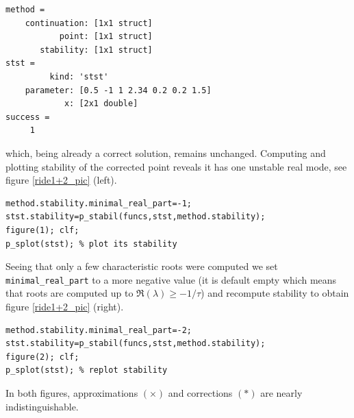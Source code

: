 \documentclass[10pt]{scrartcl}
\newcommand{\blist}[1]{\mbox{\lstinline!#1!}}
\begin{document}
{\small
\begin{verbatim}
method = 
    continuation: [1x1 struct]
           point: [1x1 struct]
       stability: [1x1 struct]
stst = 
         kind: 'stst'
    parameter: [0.5 -1 1 2.34 0.2 0.2 1.5]
            x: [2x1 double]
success =
     1
\end{verbatim}
}
\noindent which, being already a correct solution, remains unchanged.
Computing and plotting stability of the corrected point reveals 
it has one unstable real mode, see figure \ref{ride1+2_pic} (left).
\begin{lstlisting}
method.stability.minimal_real_part=-1;
stst.stability=p_stabil(funcs,stst,method.stability);
figure(1); clf;
p_splot(stst); % plot its stability  
\end{lstlisting}
Seeing that only a few characteristic roots were computed we set
\blist{minimal_real_part} to a more negative value (it is default
empty which means that roots are computed up to
$\Re(\lambda)\geq-1/\tau$) and recompute stability to obtain figure
\ref{ride1+2_pic} (right).  
\begin{lstlisting}
method.stability.minimal_real_part=-2;
stst.stability=p_stabil(funcs,stst,method.stability);
figure(2); clf;
p_splot(stst); % replot stability  
\end{lstlisting}
\noindent In both figures, approximations $(\times)$ and corrections $(*)$
are nearly indistinguishable.
\end{document}

